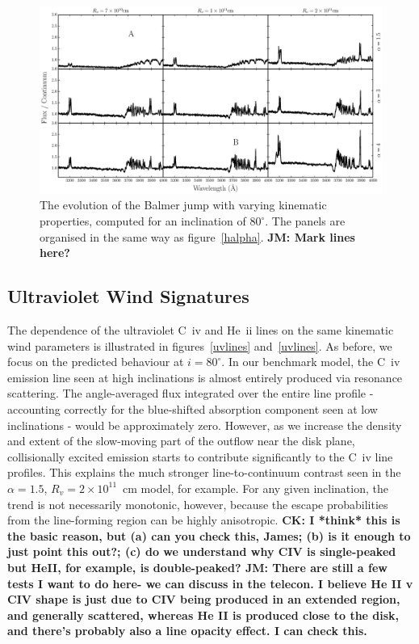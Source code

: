\documentclass[preprint, a4paper, 11pt]{aastex}
\begin{document}
\begin{figure} %
\centering
\includegraphics[width=1.0\textwidth]{figures/3by3_grid_balmer.eps}  
\caption{
The evolution of the Balmer jump with varying kinematic 
properties, computed for an inclination of $80^\circ$. 
The panels are organised in the same way as figure~\ref{halpha}.
{\bf JM: Mark lines here?}
}
\label{jump}
\end{figure} %

\subsection{Ultraviolet Wind Signatures}
\label{modelb_uv}

The dependence of the ultraviolet C~{\sc iv} and He~{\sc ii} lines on
the same kinematic wind parameters is illustrated in figures~\ref{uvlines}
and~\ref{uvlines}. As before, we focus on the predicted behaviour at $i =
80^\circ$. In our benchmark model, the C~{\sc iv} emission
line seen at high inclinations is almost entirely produced via
resonance scattering. The angle-averaged flux integrated over the
entire line profile - accounting correctly for the blue-shifted
absorption component seen at low inclinations - would be
approximately zero. However, as we increase the density and extent of
the slow-moving part of the outflow near the disk plane, collisionally
excited emission starts to contribute significantly to the C~{\sc iv}
line profiles. This explains the much stronger line-to-continuum
contrast seen in the $\alpha = 1.5$, $R_v = 2\times 10^{11}$~cm model,
for example. For any given inclination, the trend is not necessarily
monotonic, however, because the escape probabilities from the
line-forming region can be highly anisotropic.  
{\bf CK: I *think* this is the basic reason, but (a) can you check
  this, James; (b) is it enough to just point this out?; (c) do we
  understand why CIV is single-peaked but HeII, for example, is double-peaked?
  JM: There are still a few tests I want to do here- we can discuss in the telecon.
  I believe He II v CIV shape is just due to CIV being produced in an extended region,
  and generally scattered, whereas He II is produced close to the disk, and there's probably
  also a line opacity effect.
  I can check this.}
\end{document}
